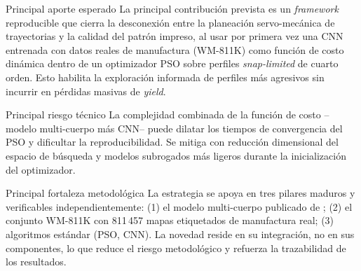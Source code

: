 \documentclass[11pt]{article}
\begin{document}
\begin{infobox}{Principal aporte esperado}
La principal contribución prevista es un \textit{framework} reproducible que cierra la desconexión entre la planeación servo-mecánica de trayectorias y la calidad del patrón impreso, al usar por primera vez una CNN entrenada con datos reales de manufactura (WM-811K) como función de costo dinámica dentro de un optimizador PSO sobre perfiles \textit{snap-limited} de cuarto orden. Esto habilita la exploración informada de perfiles más agresivos sin incurrir en pérdidas masivas de \textit{yield}.
\end{infobox}

\begin{infobox}{Principal riesgo técnico}
La complejidad combinada de la función de costo --modelo multi-cuerpo más CNN-- puede dilatar los tiempos de convergencia del PSO y dificultar la reproducibilidad. Se mitiga con reducción dimensional del espacio de búsqueda y modelos subrogados más ligeros durante la inicialización del optimizador.
\end{infobox}

\begin{infobox}{Principal fortaleza metodológica}
La estrategia se apoya en tres pilares maduros y verificables independientemente: (1) el modelo multi-cuerpo publicado de \cite{Al-Rawashdeh2022_Caracterization}; (2) el conjunto WM-811K con 811\,457 mapas etiquetados de manufactura real; (3) algoritmos estándar (PSO, CNN). La novedad reside en su integración, no en sus componentes, lo que reduce el riesgo metodológico y refuerza la trazabilidad de los resultados.
\end{infobox}
\end{document}
